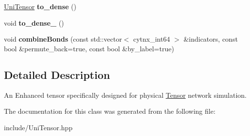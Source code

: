 \begin{DoxyCompactItemize}
\item 
\mbox{\label{classcytnx_1_1UniTensor_a4aeec131076ae541e8be7cdb930e151b}} 
\hyperlink{classcytnx_1_1UniTensor}{Uni\+Tensor} {\bfseries to\+\_\+dense} ()
\item 
\mbox{\label{classcytnx_1_1UniTensor_a169c56f48f851fe173067632e30200dc}} 
void {\bfseries to\+\_\+dense\+\_\+} ()
\item 
\mbox{\label{classcytnx_1_1UniTensor_a0a75eb4843d626eacb86fc42a75d1c13}} 
void {\bfseries combine\+Bonds} (const std\+::vector$<$ cytnx\+\_\+int64 $>$ \&indicators, const bool \&permute\+\_\+back=true, const bool \&by\+\_\+label=true)
\end{DoxyCompactItemize}


\subsection{Detailed Description}
An Enhanced tensor specifically designed for physical \hyperlink{classcytnx_1_1Tensor}{Tensor} network simulation. 

The documentation for this class was generated from the following file\+:\begin{DoxyCompactItemize}
\item 
include/Uni\+Tensor.\+hpp\end{DoxyCompactItemize}
